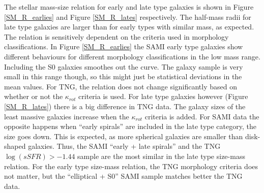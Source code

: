The stellar mass-size relation for early and late type galaxies is shown in Figure \ref{SM_R_earlies} and Figure \ref{SM_R_lates} respectively. %
The half-mass radii for late type galaxies are larger than for early types with similar mass, as expected. The relation is sensitively dependent on the criteria used in morphology classifications. In Figure \ref{SM_R_earlies} the SAMI early type galaxies show different behaviours for different morphology classifications in the low mass range. Including the S0 galaxies smoothes out the curve. The galaxy sample is very small %
in this range though, so this might just be statistical deviations in the mean values. For TNG, the relation does not change significantly based on whether or not the $\kappa_{rot}$ criteria is used. 
For late type galaxies however (Figure \ref{SM_R_lates}) there is a big difference in TNG data. The galaxy sizes of the least massive galaxies increase when the $\kappa_{rot}$ criteria is added. For SAMI data the opposite happens when ``early spirals'' are included in the late type category, the size goes down. This is expected, as more spherical galaxies are smaller than disk-shaped galaxies. Thus, the SAMI ``early + late spirals'' and the TNG $\log(sSFR) > -1.44$ sample are the most similar in the late type size-mass relation. For the early type size-mass relation, the TNG morphology criteria does not matter, but the ``elliptical + S0'' SAMI sample matches better the TNG data.


